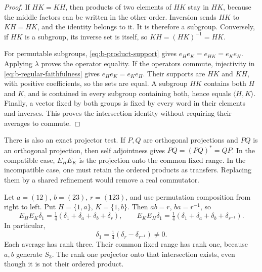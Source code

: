 \begin{proof}
If \(HK=KH\), then products of two elements of \(HK\) stay in \(HK\), because the middle factors can be written in the other order. Inversion sends \(HK\) to \(KH=HK\), and the identity belongs to it. It is therefore a subgroup. Conversely, if \(HK\) is a subgroup, its inverse set is itself, so \(KH=(HK)^{-1}=HK\).

For permutable subgroups, \eqref{eq:b-product-support} gives \(e_He_K=e_{HK}=e_Ke_H\). Applying \(\lambda\) proves the operator equality. If the operators commute, injectivity in \eqref{eq:b-regular-faithfulness} gives \(e_He_K=e_Ke_H\). Their supports are \(HK\) and \(KH\), with positive coefficients, so the sets are equal. A subgroup \(HK\) contains both \(H\) and \(K\), and is contained in every subgroup containing both, hence equals \(\langle H,K\rangle\). Finally, a vector fixed by both groups is fixed by every word in their elements and inverses. This proves the intersection identity without requiring their averages to commute.
\end{proof}

There is also an exact projector test. If \(P,Q\) are orthogonal projections and \(PQ\) is an orthogonal projection, then self adjointness gives \(PQ=(PQ)^*=QP\). In the compatible case, \(E_HE_K\) is the projection onto the common fixed range. In the incompatible case, one must retain the ordered products as transfers. Replacing them by a shared refinement would remove a real commutator.

\begin{example}
\label{ex:b-s3-incompatibility}
Let \(a=(12)\), \(b=(23)\), \(r=(123)\), and use permutation composition from right to left. Put \(H=\{1,a\}\), \(K=\{1,b\}\). Then \(ab=r\), \(ba=r^{-1}\), so
\[
 E_HE_K\delta_1=\tfrac14(\delta_1+\delta_a+\delta_b+\delta_r),
 \qquad
 E_KE_H\delta_1=\tfrac14(\delta_1+\delta_a+\delta_b+\delta_{r^{-1}}).
\]
In particular,
\begin{equation}
 [E_H,E_K]\delta_1
 =\tfrac14(\delta_r-\delta_{r^{-1}})\ne0.
 \label{eq:b-s3-commutator}
\end{equation}
Each average has rank three. Their common fixed range has rank one, because \(a,b\) generate \(S_3\). The rank one projector onto that intersection exists, even though it is not their ordered product.
\end{example}

